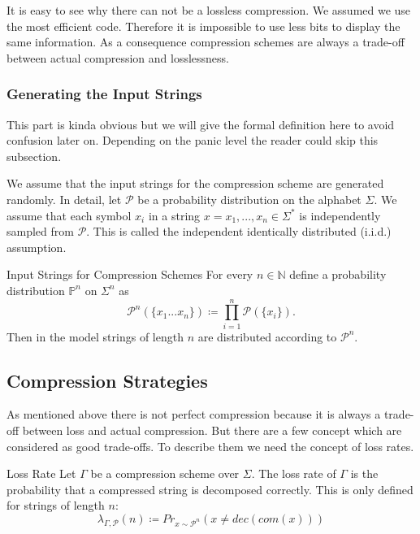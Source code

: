 \documentclass{panikzettel}
\begin{document}
It is easy to see why there can not be a lossless compression. We assumed we use the most efficient code. Therefore it is impossible to use less bits to display the same information. As a consequence compression schemes are always a trade-off between actual compression and losslessness. %

\subsubsection{Generating the Input Strings}
This part is kinda obvious but we will give the formal definition here to avoid confusion later on. Depending on the panic level the reader could skip this subsection.

\begin{halfboxl}
\vspace{-\baselineskip}
	We assume that the input strings for the compression scheme are generated randomly. In detail, let $\mathcal{P}$ be a probability distribution on the alphabet $\Sigma$. We assume that each symbol $x_i$ in a string $x=x_1,...,x_n\in\Sigma^*$ is independently sampled from $\mathcal{P}$. This is called the independent identically distributed (i.i.d.) assumption.
\end{halfboxl}
\begin{halfboxr}
\vspace{-\baselineskip}
	\begin{defi}{Input Strings for Compression Schemes}
	For every $n\in\mathbb{N}$ define a probability distribution $\mathbb{P}^n$ on $\Sigma^n$ as
	\[
	\mathcal{P}^n(\{x_1 ... x_n \})\coloneqq \prod_{i=1}^n \mathcal{P}(\{x_i \}).
	\]
	Then in the model strings of length $n$ are distributed according to $\mathcal{P}^n$.
	\end{defi}
\end{halfboxr}

\subsection{Compression Strategies}
As mentioned above there is not perfect compression because it is always a trade-off between loss and actual compression. But there are a few concept which are considered as good trade-offs. To describe them we need the concept of loss rates.

\begin{defi}{Loss Rate}
Let $\Gamma$ be a compression scheme over $\Sigma$. The loss rate of $\Gamma$ is the probability that a compressed string is decomposed correctly. This is only defined for strings of length $n$:
\[
\lambda_{\Gamma, \mathcal{P}}(n)\coloneqq Pr_{x \sim \mathcal{P}^n}(x \neq dec(com(x)))
\]
\end{defi}
\end{document}
